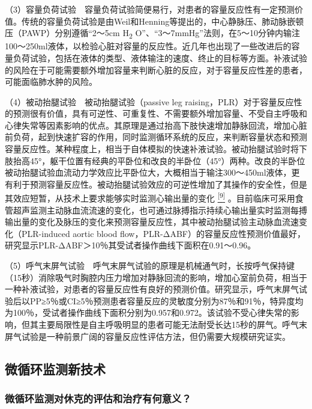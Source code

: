 （3）容量负荷试验　容量负荷试验简便易行，对患者的容量反应性有一定预测价值。传统的容量负荷试验是由Weil和Henning等提出的，中心静脉压、肺动脉嵌顿压（PAWP）分别遵循“2～5cm
H\textsubscript{2}
O”、“3～7mmHg”法则，在5～10分钟内输注100～250ml液体，以检验心脏对容量的反应性。近几年也出现了一些改进后的容量负荷试验，包括在液体的类型、液体输注的速度、终止的目标等方面。补液试验的风险在于可能需要额外增加容量来判断心脏的反应，对于容量反应性差的患者，可能面临肺水肿的风险。

（4）被动抬腿试验　被动抬腿试验（passive leg
raising，PLR）对于容量反应性的预测很有价值，具有可逆性、可重复性、不需要额外增加容量、不受自主呼吸和心律失常等因素影响的优点。其原理是通过抬高下肢快速增加静脉回流，增加心脏前负荷，起到快速扩容的作用，同时监测循环系统的反应，来判断容量状态和预测容量反应性。某种程度上，相当于自体模拟的快速补液试验。被动抬腿试验时将下肢抬高45°，躯干位置有经典的平卧位和改良的半卧位（45°）两种。改良的半卧位被动抬腿试验血流动力学效应比平卧位大，大概相当于输注300～450ml液体，更有利于预测容量反应性。被动抬腿试验效应的可逆性增加了其操作的安全性，但是其效应短暂，从技术上要求能够实时监测心输出量的变化
\protect\hyperlink{text00010.htmlux5cux23ch9-9}{\textsuperscript{{[}9{]}}}
。目前临床可采用食管超声监测主动脉血流流速的变化，也可通过脉搏指示持续心输出量实时监测每搏输出量的变化及脉压的变化来预测容量反应性，其中被动抬腿试验主动脉血流速变化（PLR-induced
aortic blood
flow，PLR-ΔABF）的容量反应性预测价值最好，研究显示PLR-ΔABF＞10％其受试者操作曲线下面积在0.91～0.96。

（5）呼气末屏气试验　呼气末屏气试验的原理是机械通气时，长按呼气保持键（15秒）消除吸气时胸腔内压力增加对静脉回流的影响，增加心室前负荷，相当于一种补液试验，对患者的容量反应性有良好的预测价值。研究显示，呼气末屏气试验后以PP≥5％或CI≥5％预测患者容量反应的灵敏度分别为87％和91％，特异度均为100％，受试者操作曲线下面积分别为0.957和0.972。该试验不受心律失常的影响，但其主要局限性是自主呼吸明显的患者可能无法耐受长达15秒的屏气。呼气末屏气试验是一种前景广阔的容量反应性评估方法，但仍需要大规模研究证实。

\subsection{微循环监测新技术}

\subsubsection{微循环监测对休克的评估和治疗有何意义？}

